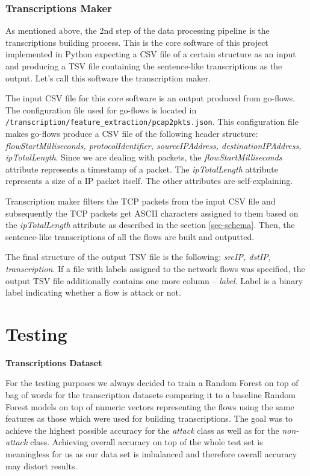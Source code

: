 \documentclass{article}
\begin{document}
\subsubsection{Transcriptions Maker}
As mentioned above, the 2nd step of the data processing pipeline is the transcriptions building process. This is the core software of this project implemented in Python expecting a CSV file of a certain structure as an input and producing a TSV file containing the sentence-like transcriptions as the output. Let's call this software the transcription maker.

The input CSV file for this core software is an output produced from go-flows. The configuration file used for go-flows is located in \verb|/transcription/feature_extraction/pcap2pkts.json|. This configuration file makes go-flows produce a CSV file of the following header structure: \textit{flowStartMilliseconds, protocolIdentifier, sourceIPAddress, destinationIPAddress, ipTotalLength}. Since we are dealing with packets, the \textit{flowStartMilliseconds} attribute represents a timestamp of a packet. The \textit{ipTotalLength} attribute represents a size of a IP packet itself. The other attributes are self-explaining.

Transcription maker filters the TCP packets from the input CSV file and subsequently the TCP packets get ASCII characters assigned to them based on the \textit{ipTotalLength} attribute as described in the section \ref{sec-schema}. Then, the sentence-like transcriptions of all the flows are built and outputted.

The final structure of the output TSV file is the following: \textit{srcIP, dstIP, transcription}. If a file with labels assigned to the network flows was specified, the output TSV file additionally contains one more column -- \textit{label}. Label is a binary label indicating whether a flow is attack or not.


\section{Testing}

\noindent\textbf{Transcriptions Dataset}

For the testing purposes we always decided to train a Random Forest on top of bag of words for the transcription datasets comparing it to a baseline Random Forest models on top of numeric vectors representing the flows using the same features as those which were used for building transcriptions. The goal was to achieve the highest possible accuracy for the \textit{attack} class as well as for the \textit{non-attack} class. Achieving overall accuracy on top of the whole test set is meaningless for us as our data set is imbalanced and therefore overall accuracy may distort results.
\end{document}
